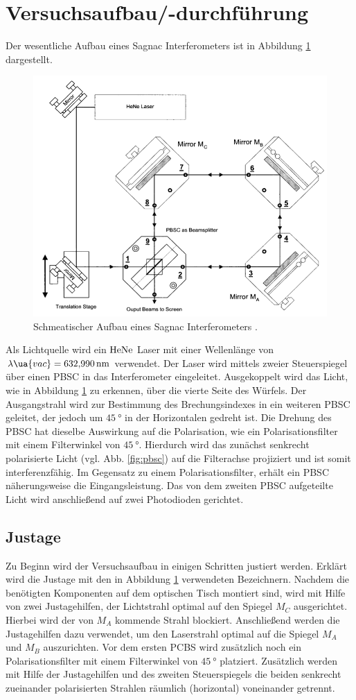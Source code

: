 \section{Versuchsaufbau/-durchführung}
Der wesentliche Aufbau eines Sagnac Interferometers ist in Abbildung \ref{fig:sagnac_interferometer}
dargestellt.
\begin{figure}
\centering
\includegraphics[width=0.6\linewidth]{./content/images/aufbau.png}
\caption{Schmeatischer Aufbau eines Sagnac Interferometers \cite{anleitung64}.}
\label{fig:sagnac_interferometer}
\end{figure}
Als Lichtquelle wird ein $\ce{HeNe}$ Laser mit einer Wellenlänge von
$\lambda\ua{vac}=\SI{632.990}{\nano\meter}$ verwendet. Der Laser wird mittels zweier Steuerspiegel
über einen PBSC in das Interferometer eingeleitet. Ausgekoppelt wird das Licht, wie
in Abbildung \ref{fig:sagnac_interferometer} zu erkennen, über die vierte Seite
des Würfels.
Der Ausgangstrahl wird zur Bestimmung des Brechungsindexes in ein weiteren
PBSC geleitet, der jedoch um $\SI{45}{\degree}$ in der Horizontalen gedreht ist.
Die Drehung des PBSC hat dieselbe Auswirkung auf die Polarisation, wie ein Polarisationsfilter mit
einem Filterwinkel von $\SI{45}{\degree}$. Hierdurch wird das zunächst senkrecht
polarisierte Licht (vgl. Abb. \ref{fig:pbsc}) auf die Filterachse projiziert und
ist somit interferenzfähig. Im Gegensatz zu einem Polarisationsfilter, erhält ein
PBSC näherungsweise die Eingangsleistung.
Das von dem zweiten PBSC aufgeteilte Licht wird
anschließend auf zwei Photodioden gerichtet.

\subsection{Justage}
Zu Beginn wird der Versuchsaufbau in einigen Schritten justiert werden.
Erklärt wird die Justage mit den in Abbildung \ref{fig:sagnac_interferometer} verwendeten Bezeichnern.
Nachdem die benötigten Komponenten auf dem optischen Tisch montiert sind,
wird mit Hilfe von zwei Justagehilfen, der Lichtstrahl optimal auf den Spiegel $M_C$
ausgerichtet. Hierbei wird der von $M_A$ kommende Strahl blockiert.
Anschließend werden die Justagehilfen dazu verwendet, um den Laserstrahl optimal auf
die Spiegel $M_A$ und $M_B$ auszurichten. Vor dem ersten PCBS wird zusätzlich noch ein Polarisationsfilter
mit einem Filterwinkel von $\SI{45}{\degree}$ platziert. Zusätzlich werden mit Hilfe der Justagehilfen
und des zweiten Steuerspiegels die beiden senkrecht zueinander polarisierten Strahlen räumlich (horizontal)
voneinander getrennt.

